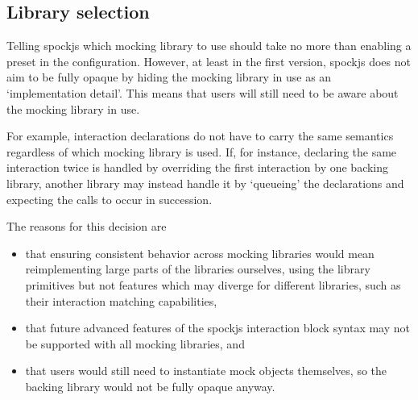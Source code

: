 \subsection{Library selection}
Telling spockjs which mocking library to use should
take no more than enabling a preset in the configuration.
However, at least in the first version,
spockjs does not aim to be fully opaque
by hiding the mocking library in use as an `implementation detail'.
This means that users will still need to be aware
about the mocking library in use.

For example, interaction declarations
do not have to carry the same semantics
regardless of which mocking library is used.
If, for instance, declaring the same interaction twice
is handled by overriding the first interaction by one backing library,
another library may instead handle it by `queueing' the declarations
and expecting the calls to occur in succession.

The reasons for this decision are
\begin{itemize}
  \item that ensuring consistent behavior across mocking libraries would mean
    reimplementing large parts of the libraries ourselves,
    using the library primitives but not features
    which may diverge for different libraries,
    such as their interaction matching capabilities,
  \item that future advanced features of the spockjs interaction block syntax
    may not be supported with all mocking libraries, and
  \item that users would still need to instantiate mock objects themselves,
    so the backing library would not be fully opaque anyway.
\end{itemize}
